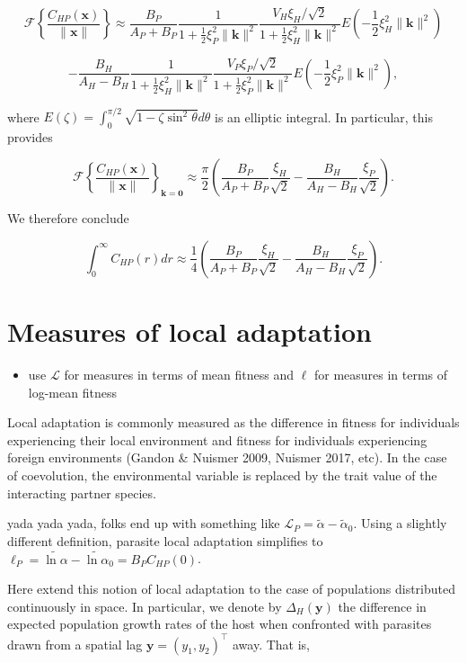 \documentclass{article}
\begin{document}
\[\mathcal F\left\{\frac{C_{HP}(\pmb x)}{\|\pmb x\|}\right\}\approx\frac{B_P}{A_P+B_P}\frac{1}{1+\frac{1}{2}\xi_P^2\|\pmb k\|^2} \frac{V_H\xi_H/\sqrt2}{1+\frac{1}{2}\xi_H^2\|\pmb k\|^2}E\left(-\frac{1}{2}\xi_H^2\|\pmb k\|^2\right)\]

\[-\frac{B_H}{A_H-B_H}\frac{1}{1+\frac{1}{2}\xi_H^2\|\pmb k\|^2} \frac{V_P\xi_P/\sqrt2}{1+\frac{1}{2}\xi_P^2\|\pmb k\|^2}E\left(-\frac{1}{2}\xi_P^2\|\pmb k\|^2\right),\]

where \(E(\zeta)=\int_0^{\pi/2}\sqrt{1-\zeta\sin^2\theta}d\theta\) is an
elliptic integral. In particular, this provides

\[\mathcal F\left\{\frac{C_{HP}(\pmb x)}{\|\pmb x\|}\right\}_{\pmb k=\pmb 0}\approx\frac{\pi}{2}\left(\frac{B_P}{A_P+B_P}\frac{\xi_H}{\sqrt2}-\frac{B_H}{A_H-B_H}\frac{\xi_P}{\sqrt2}\right).\]

We therefore conclude

\[\int_0^\infty C_{HP}(r)dr\approx\frac{1}{4}\left(\frac{B_P}{A_P+B_P}\frac{\xi_H}{\sqrt2}-\frac{B_H}{A_H-B_H}\frac{\xi_P}{\sqrt2}\right).\]

\hypertarget{measures-of-local-adaptation}{%
\section{\texorpdfstring{Measures of local adaptation
\label{la-app}}{Measures of local adaptation }}\label{measures-of-local-adaptation}}

\begin{itemize}
\tightlist
\item
  use \(\mathcal L\) for measures in terms of mean fitness and \(\ell\)
  for measures in terms of log-mean fitness
\end{itemize}

Local adaptation is commonly measured as the difference in fitness for
individuals experiencing their local environment and fitness for
individuals experiencing foreign environments (Gandon \& Nuismer 2009,
Nuismer 2017, etc). In the case of coevolution, the environmental
variable is replaced by the trait value of the interacting partner
species.

yada yada yada, folks end up with something like
\(\mathcal L_P=\tilde\alpha-\tilde\alpha_0\). Using a slightly different
definition, parasite local adaptation simplifies to
\(\ell_P=\widetilde{\ln\alpha}-\widetilde{\ln\alpha}_0=B_PC_{HP}(0)\).

Here extend this notion of local adaptation to the case of populations
distributed continuously in space. In particular, we denote by
\(\Delta_H(\pmb y)\) the difference in expected population growth rates
of the host when confronted with parasites drawn from a spatial lag
\(\pmb y=(y_1,y_2)^\top\) away. That is,
\end{document}
